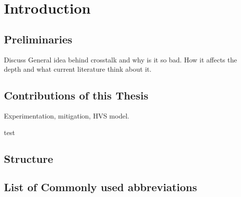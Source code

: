 
\chapter{Introduction}
\label{chap:intro}


\section{Preliminaries}
Discuss General idea behind crosstalk and why is it so bad. How it affects the depth and what current literature think about it.



\section{Contributions of this Thesis}
Experimentation, mitigation, HVS model.

test

\section{Structure}



\section{List of Commonly used abbreviations}

